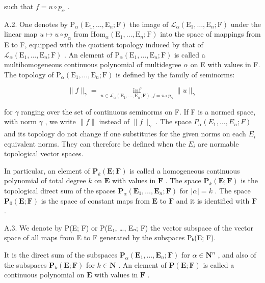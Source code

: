 such that \(f = u \circ p_{\alpha}\) .

A.2. One denotes by \(\mathrm{P}_{\alpha}(\mathrm{E}_{1},\ldots,\mathrm{E}_{n};\mathrm{F})\) the image of \(\mathcal{L}_{\alpha}(\mathrm{E}_{1},\ldots,\mathrm{E}_{n};\mathrm{F})\) under the linear map \(u\mapsto u\circ p_{\alpha}\) from \(\mathrm{Hom}_{\alpha}(\mathrm{E}_{1},\ldots,\mathrm{E}_{n};\mathrm{F})\) into the space of mappings from E to F, equipped with the quotient topology induced by that of \(\mathcal{L}_{\alpha}(\mathrm{E}_{1},\ldots,\mathrm{E}_{n};\mathrm{F})\) . An element of \(\mathrm{P}_{\alpha}(\mathrm{E}_{1},\ldots,\mathrm{E}_{n};\mathrm{F})\) is called a multihomogeneous continuous polynomial of multidegree \(\alpha\) on E with values in F. The topology of \(\mathrm{P}_{\alpha}(\mathrm{E}_{1},\ldots,\mathrm{E}_{n};\mathrm{F})\) is defined by the family of seminorms:

\[
\| f \| _ {\gamma} = \inf _ {u \in \mathscr {L} _ {\alpha} (\mathrm{E} _ {1}, \dots , \mathrm{E} _ {n}; \mathrm{F}), f = u \circ p _ {\alpha}} \| u \| _ {\gamma}
\]

for \(\gamma\) ranging over the set of continuous seminorms on F. If F is a normed space, with norm \(\gamma\) , we write \(\|f\|\) instead of \(\|f\|_{\gamma}\) . The space \(P_{\alpha}(E_{1},\ldots,E_{n};F)\) and its topology do not change if one substitutes for the given norms on each \(E_{i}\) equivalent norms. They can therefore be defined when the \(E_{i}\) are normable topological vector spaces.

In particular, an element of \(\mathbf{P}_{k}(\mathbf{E};\mathbf{F})\) is called a homogeneous continuous polynomial of total degree \(k\) on \(\mathbf{E}\) with values in \(\mathbf{F}\) . The space \(\mathbf{P}_{k}(\mathbf{E};\mathbf{F})\) is the topological direct sum of the spaces \(\mathbf{P}_{\alpha}(\mathbf{E}_{1},\ldots,\mathbf{E}_{n};\mathbf{F})\) for \(|\alpha| = k\) . The space \(\mathbf{P}_{0}(\mathbf{E};\mathbf{F})\) is the space of constant maps from \(\mathbf{E}\) to \(\mathbf{F}\) and it is identified with \(\mathbf{F}\) .

A.3. We denote by P(E; F) or P(E₁, \ldots, Eₙ; F) the vector subspace of the vector space of all maps from E to F generated by the subspaces Pₖ(E; F).

It is the direct sum of the subspaces \(\mathbf{P}_{\alpha}(\mathbf{E}_{1},\ldots,\mathbf{E}_{n};\mathbf{F})\) for \(\alpha\in\mathbf{N}^{n}\) , and also of the subspaces \(\mathbf{P}_{k}(\mathbf{E};\mathbf{F})\) for \(k\in\mathbf{N}\) . An element of \(\mathbf{P}(\mathbf{E};\mathbf{F})\) is called a continuous polynomial on \(\mathbf{E}\) with values in \(\mathbf{F}\) .

